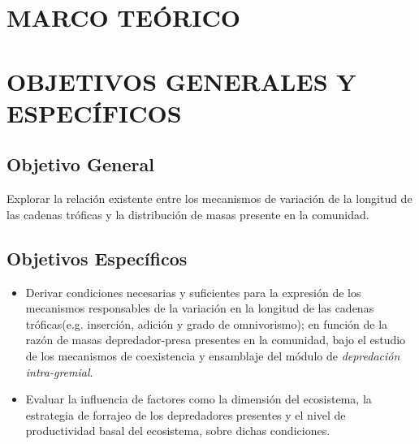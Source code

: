 \documentclass [11pt,a4paper]{article}
\numberwithin{equation}{section}
\begin{document}
\tableofcontents
\clearpage
\listoffigures
\listoftables
\clearpage


\clearpage
{}


\section{MARCO TE\'ORICO}


\section{OBJETIVOS GENERALES Y ESPEC\'IFICOS}
\subsection{Objetivo General}
Explorar la relaci\'on existente entre los mecanismos de variaci\'on de la longitud de las cadenas tr\'oficas y la distribuci\'on de masas presente en la comunidad.
\subsection{Objetivos Espec\'ificos}
\begin{itemize}
\item Derivar condiciones necesarias y suficientes para la expresi\'on de los mecanismos responsables de la variaci\'on en la longitud de las cadenas tr\'oficas(e.g. inserci\'on, adici\'on y  grado de omnivorismo); en funci\'on de la raz\'on de masas depredador-presa presentes en la comunidad, bajo el estudio de los mecanismos de coexistencia y ensamblaje del m\'odulo de \emph{depredaci\'on intra-gremial}.
\item Evaluar la influencia de factores como la dimensi\'on del ecosistema, la estrategia de forrajeo de los depredadores presentes y el nivel de productividad basal del ecosistema, sobre dichas condiciones.
\end{itemize}
\end{document}
